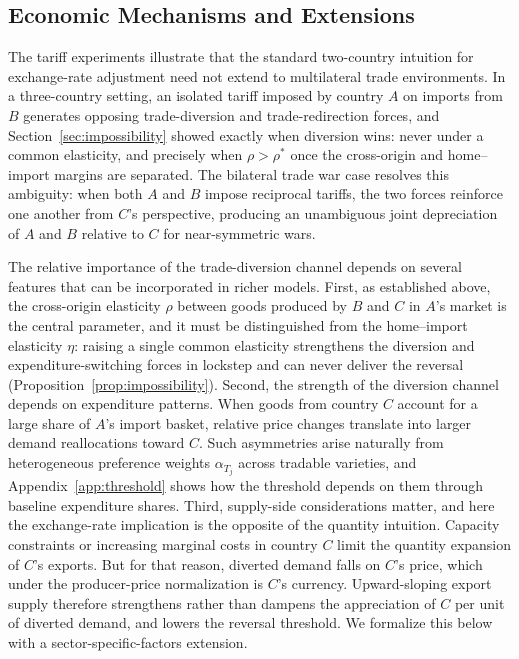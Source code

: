 \documentclass[11pt]{article}
\theoremstyle{plain}
\theoremstyle{remark}
\numberwithin{lemma}{section}
\numberwithin{proposition}{section}
\numberwithin{corollary}{section}
\newcommand{\rev}[1]{{\color{RevBlue}#1}}
\begin{document}
\subsection{Economic Mechanisms and Extensions}

The tariff experiments illustrate that the standard two-country intuition for exchange-rate adjustment need not extend to multilateral trade environments. In a three-country setting, an isolated tariff imposed by country $A$ on imports from $B$ generates opposing trade-diversion and trade-redirection forces\rev{, and Section~\ref{sec:impossibility} showed exactly when diversion wins: never under a common elasticity, and precisely when $\rho > \rho^*$ once the cross-origin and home--import margins are separated}. The bilateral trade war case resolves this ambiguity: when both $A$ and $B$ impose reciprocal tariffs, the two forces reinforce one another from $C$'s perspective, producing an unambiguous joint depreciation of $A$ and $B$ relative to $C$ \rev{for near-symmetric wars}.

The relative importance of the trade-diversion channel depends on several features that can be incorporated in richer models. First, \rev{as established above, the cross-origin elasticity $\rho$ between goods produced by $B$ and $C$ in $A$'s market is the central parameter, and it must be distinguished from the home--import elasticity $\eta$: raising a single common elasticity strengthens the diversion and expenditure-switching forces in lockstep and can never deliver the reversal (Proposition~\ref{prop:impossibility})}. Second, the strength of the diversion channel depends on expenditure patterns. When goods from country $C$ account for a large share of $A$'s import basket, relative price changes translate into larger demand reallocations toward $C$. Such asymmetries arise naturally from heterogeneous preference weights $\alpha_{T_j}$ across tradable varieties\rev{, and Appendix~\ref{app:threshold} shows how the threshold depends on them through baseline expenditure shares}. Third, supply-side considerations matter\rev{, and here the exchange-rate implication is the opposite of the quantity intuition. Capacity constraints or increasing marginal costs in country $C$ limit the quantity expansion of $C$'s exports. But for that reason, diverted demand falls on $C$'s price, which under the producer-price normalization is $C$'s currency. Upward-sloping export supply therefore strengthens rather than dampens the appreciation of $C$ per unit of diverted demand, and lowers the reversal threshold. We formalize this below with a sector-specific-factors extension.}
\end{document}
